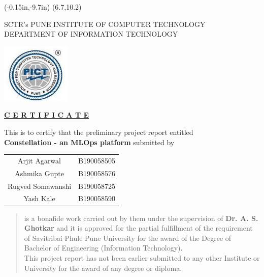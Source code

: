 \documentclass[12pt,a4paper]{report}     %
\begin{document}
	\thisfancyput(-0.15in,-9.7in){%
\setlength{\unitlength}{1in}\framebox(6.7,10.2)}
\begin{center}

{ SCTR's
   PUNE INSTITUTE OF COMPUTER TECHNOLOGY \\
   \small{DEPARTMENT OF INFORMATION TECHNOLOGY} \\

}
\vspace{0.10in}

\vspace{0.1in}
\includegraphics[scale=1.5]{pict_logo.png}
\end{center}
\vspace{0.075in}
\begin{center}
\textbf{\underline{C E R T I F I C A T E}}
\vspace{0.08in}
\end{center}
		\noindent
  				\setlength{\baselineskip}{1.1\baselineskip}
	\begin{center}
This is to certify that the preliminary project report entitled  \\
		\textbf{Constellation - an MLOps platform} 
\singlespace
submitted by\\
\begin{center}
\begin{tabular}{ c c }
    
    Arjit Agarwal & B190058505 \\
    Ashmika Gupte & B190058576 \\
    Rugved Somawanshi & B190058725 \\
    Yash Kale & B190058590 \\
\end{tabular}
 
	\end{center}
	\end{center}

\onehalfspace
\begin{quote}
is a bonafide work carried out by them under the supervision of \textbf{Dr. A. S. Ghotkar} and
it is approved for the partial fulfillment of the requirement of Savitribai Phule Pune University for the award of the Degree of Bachelor of Engineering (Information Technology).\\

This project report has not been earlier submitted to any other Institute or University for the award of any degree or diploma.\\
\end{quote}
		\noindent 
		
\end{document}
